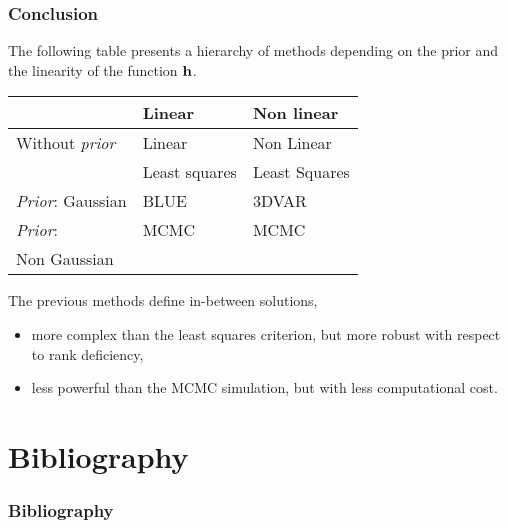 \documentclass{beamer}
\begin{document}
\begin{frame}
\frametitle{Conclusion}

The following table presents a hierarchy of methods depending on the 
prior and the linearity of the function ${\bf h}$.

\begin{center}
\begin{tabular}{lll}
                     & {\bf Linear}  & {\bf Non linear} \\
\hline
Without \emph{prior} & Linear        & Non Linear \\
                     & Least squares & Least Squares \\
\hline
\emph{Prior}: Gaussian & BLUE & 3DVAR \\
\hline
\emph{Prior}: & MCMC & MCMC \\
Non Gaussian &  &  \\
\hline
\end{tabular}
\end{center}

The previous methods define in-between solutions, 
\begin{itemize}
\item more complex than the least squares criterion, but more robust with 
respect to rank deficiency, 
\item less powerful than the MCMC simulation, but with less computational 
cost. 
\end{itemize}

\end{frame}

\section{Bibliography}
\begin{frame}[allowframebreaks]
\frametitle{Bibliography}
\nocite{*}


\end{frame}
\end{document}
